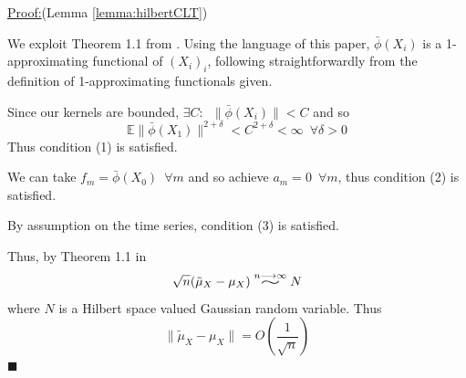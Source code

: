 \documentclass[]{article}
\newenvironment{claimproof}[1]{\par\noindent\underline{Proof:}\space#1}{\hfill $\blacksquare$}
\newcommand{\widesim}[2][1.5]{
  \mathrel{\overset{#2}{\scalebox{#1}[1]{$\sim$}}}}
\begin{document}
\begin{claimproof}(Lemma \ref{lemma:hilbertCLT})

We exploit Theorem 1.1 from \cite{dehling2015bootstrap}. Using the language of this paper, $\bar{\phi}(X_i)$ is a 1-approximating functional of $(X_i)_i$, following straightforwardly from the definition of 1-approximating functionals given. 

Since our kernels are bounded, $\exists C: \enspace \|\bar{\phi}(X_i)\| < C $ and so \[\mathbb{E}\|\bar{\phi}(X_1)\|^{2+\delta} <C^{2+\delta}< \infty \enspace \forall \delta>0\]
Thus condition (1) is satisfied.

We can take $f_m = \bar{\phi}(X_0)\enspace \forall m$ and so achieve $a_m= 0 \enspace \forall m$, thus condition (2) is satisfied.

By assumption on the time series, condition (3) is satisfied.

Thus, by Theorem 1.1 in \cite{dehling2015bootstrap}
\[\sqrt{n} (\tilde{\mu}_{X} - \mu_{X}) \widesim[2]{n\longrightarrow\infty} N\]
where $N$ is a Hilbert space valued Gaussian random variable. Thus 
\[\|\tilde{\mu}_{X} - \mu_{X}\| = O(\frac{1}{\sqrt{n}})\]
\end{claimproof}
\end{document}
